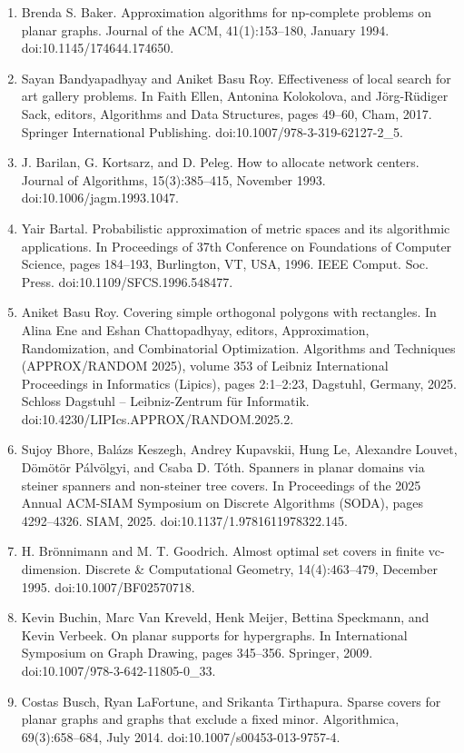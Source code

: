 \begin{enumerate}
\item[]  [1]  Brenda S. Baker.  Approximation algorithms for np-complete problems on planar graphs.  Journal of the ACM, 41(1):153–180, January 1994.  doi:10.1145/174644.174650.  
\item[]  [2]  Sayan Bandyapadhyay and Aniket Basu Roy.  Effectiveness of local search for art gallery problems.  In Faith Ellen, Antonina Kolokolova, and Jörg-Rüdiger Sack, editors, Algorithms and Data Structures, pages 49–60, Cham, 2017. Springer International Publishing.  doi:10.1007/978-3-319-62127-2\_5.  
\item[]  [3]  J. Barilan, G. Kortsarz, and D. Peleg.  How to allocate network centers.  Journal of Algorithms, 15(3):385–415, November 1993.  doi:10.1006/jagm.1993.1047.  
\item[]  [4]  Yair Bartal.  Probabilistic approximation of metric spaces and its algorithmic applications.  In Proceedings of 37th Conference on Foundations of Computer Science, pages 184–193, Burlington, VT, USA, 1996. IEEE Comput. Soc. Press.  doi:10.1109/SFCS.1996.548477.  
\item[]  [5]  Aniket Basu Roy.  Covering simple orthogonal polygons with rectangles.  In Alina Ene and Eshan Chattopadhyay, editors, Approximation, Randomization, and Combinatorial Optimization. Algorithms and Techniques (APPROX/RANDOM 2025), volume 353 of Leibniz International Proceedings in Informatics (Lipics), pages 2:1–2:23, Dagstuhl, Germany, 2025. Schloss Dagstuhl – Leibniz-Zentrum für Informatik.  doi:10.4230/LIPIcs.APPROX/RANDOM.2025.2.  
\item[]  [6]  Sujoy Bhore, Balázs Keszegh, Andrey Kupavskii, Hung Le, Alexandre Louvet, Dömötör Pálvölgyi, and Csaba D. Tóth.  Spanners in planar domains via steiner spanners and non-steiner tree covers.  In Proceedings of the 2025 Annual ACM-SIAM Symposium on Discrete Algorithms (SODA), pages 4292–4326. SIAM, 2025.  doi:10.1137/1.9781611978322.145.  
\item[]  [7]  H. Brönnimann and M. T. Goodrich.  Almost optimal set covers in finite vc-dimension.  Discrete \& Computational Geometry, 14(4):463–479, December 1995.  doi:10.1007/BF02570718.  
\item[]  [8]  Kevin Buchin, Marc Van Kreveld, Henk Meijer, Bettina Speckmann, and Kevin Verbeek.  On planar supports for hypergraphs.  In International Symposium on Graph Drawing, pages 345–356. Springer, 2009.  doi:10.1007/978-3-642-11805-0\_33.  
\item[]  [9]  Costas Busch, Ryan LaFortune, and Srikanta Tirthapura.  Sparse covers for planar graphs and graphs that exclude a fixed minor.  Algorithmica, 69(3):658–684, July 2014.  doi:10.1007/s00453-013-9757-4.  

\end{enumerate}
